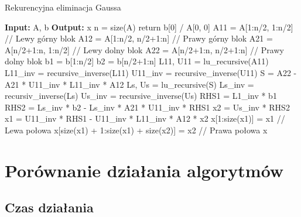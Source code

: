 \documentclass[11pt, leqno]{scrartcl}
\begin{document}
    \begin{algorithm}[H]
        \caption{Rekurencyjna eliminacja Gaussa}
        \begin{algorithmic}
            \State \textbf{Input:} A, b
            \State \textbf{Output:} x
                \State n = size(A)
                    \State return b[0] / A[0, 0]
                \EndIf
                \State
                \State A11 = A[1:n/2, 1:n/2]      // Lewy górny blok
                \State A12 = A[1:n/2, n/2+1:n]    // Prawy górny blok
                \State A21 = A[n/2+1:n, 1:n/2]    // Lewy dolny blok
                \State A22 = A[n/2+1:n, n/2+1:n]  // Prawy dolny blok
                \State b1 = b[1:n/2]
                \State b2 = b[n/2+1:n]
                \State
                \State L11, U11 = lu\_recursive(A11)
                \State L11\_inv = recursive\_inverse(L11)
                \State U11\_inv = recursive\_inverse(U11)
                \State S = A22 - A21 * U11\_inv * L11\_inv * A12
                \State Ls, Us = lu\_recursive(S)
                \State Ls\_inv = recursiv\_inverse(Ls)
                \State Us\_inv = recursive\_inverse(Us)
                \State
                \State RHS1 = L1\_inv * b1
                \State RHS2 = Ls\_inv * b2 -
                    Ls\_inv * A21 * U11\_inv * RHS1
                \State x2 = Us\_inv * RHS2
                \State x1 = U11\_inv * RHS1 -
                    U11\_inv * L11\_inv * A12 * x2
                    \State
                \State x[1:size(x1)] = x1     // Lewa połowa
                \State x[size(x1) + 1:size(x1) + size(x2)] =
                    x2                        // Prawa połowa
                \State \Return x
            \EndFunction
        \end{algorithmic}
    \end{algorithm}

    \section{Porównanie działania algorytmów}
    \subsection{Czas działania}
    
\end{document}
